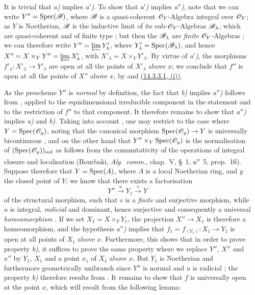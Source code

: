It is trivial that \emph{a)} implies \emph{a$'$)}.
To show that \emph{a$'$)} implies \emph{a$''$)}, note that we can write $Y''=\operatorname{Spec}(\mathscr{B})$, where $\mathscr{B}$ is a quasi-coherent $\mathscr{O}_Y$-Algebra integral over $\mathscr{O}_Y$; as $Y$ is Noetherian, $\mathscr{B}$ is the inductive limit of its sub-$\mathscr{O}_Y$-Algebras $\mathscr{B}_\lambda$, which are quasi-coherent and of finite type ; but then the $\mathscr{B}_\lambda$ are \emph{finite} $\mathscr{O}_Y$-Algebras ; we can therefore write $Y''=\varprojlim Y'_\lambda$, where $Y'_\lambda=\operatorname{Spec}(\mathscr{B}_\lambda)$, and hence $X''=X\times_Y Y''=\varprojlim X'_\lambda$, with $X'_\lambda=X\times_Y Y'_\lambda$.
By virtue of \emph{a$'$)}, the morphisms $f'_\lambda:X'_\lambda\to Y'_\lambda$ are open at all the points of $X'_\lambda$ above $x$; we conclude that $f''$ is open at all the points of $X''$ above $x$, by  and {\hyperref[IV.14.3.3.1]{(14.3.3.1, (i))}}.

As the prescheme $Y''$ is \emph{normal} by definition, the fact that \emph{b)} implies \emph{a$''$)} follows from , applied to the equidimensional irreducible component in the statement and to the restriction of $f''$ to that component.
It therefore remains to show that \emph{a$''$)} implies \emph{a)} and \emph{b)}.
Taking into account , one may restrict to the case where $Y=\operatorname{Spec}(\mathscr{O}_y)$, noting that the canonical morphism $\operatorname{Spec}(\mathscr{O}_y)\to Y$ is universally bicontinuous , and on the other hand that $Y''\times_Y\operatorname{Spec}(\mathscr{O}_y)$ is the normalisation of $(\operatorname{Spec}(\mathscr{O}_y))_{\mathrm{red}}$ as follows from the commutativity of the operations of integral closure and localisation (Bourbaki, \emph{Alg.\ comm.}, chap.~V, \S~1, n\textsuperscript{o}~5, prop.~16).
Suppose therefore that $Y=\operatorname{Spec}(A)$, where $A$ is a local Noetherian ring, and $y$ the closed point of $Y$; we know  that there exists a factorisation
\[
  Y'' \xrightarrow{u} Y_1 \xrightarrow{v} Y
\]
of the structural morphism, such that $v$ is a \emph{finite} and surjective morphism, while $u$ is integral, \emph{radicial} and dominant, hence surjective  and consequently a universal \emph{homeomorphism} .
If we set $X_1=X\times_Y Y_1$, the projection $X''\to X_1$ is therefore a homeomorphism, and the hypothesis \emph{a$''$)} implies that $f_1=f_{(Y_1)}:X_1\to Y_1$ is open at all points of $X_1$ above $x$.
Furthermore, this shows that in order to prove property \emph{b)}, it suffices to prove the same property where we replace $Y''$, $X''$ and $x''$ by $Y_1$, $X_1$ and a point $x_1$ of $X_1$ above $x$.
But $Y_1$ is Noetherian and furthermore geometrically unibranch since $Y''$ is normal and $u$ is radicial ; the property \emph{b)} therefore results from .
It remains to show that $f$ is universally open at the point $x$, which will result from the following lemma:

